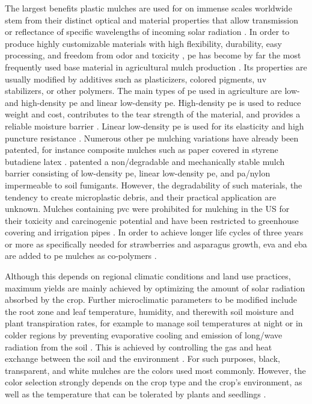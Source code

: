 The largest benefits plastic mulches are used for on immense scales worldwide stem from their distinct optical and material properties that allow transmission or reflectance of specific wavelengths of incoming solar radiation \citep{BrownBlack2001,Chalker-ScottImpact2007,CsizinszkyColor1995,GordonPlastic2008,HaynesUse1987}. In order to produce highly customizable materials with high flexibility, durability, easy processing, and freedom from odor and toxicity \citep{WrightIns2019}, \ac{pe} has become by far the most frequently used base material in agricultural mulch production \citep{Diaz-PerezBell2010,KaraEffects2013,LocascioRed2005,SivanNew2011}. Its properties are usually modified by additives such as plasticizers, colored pigments, \ac{uv} stabilizers, or other polymers. The main types of \ac{pe} used in agriculture are low- and high-density \ac{pe} and linear low-density \ac{pe}.
High-density \ac{pe} is used to reduce weight and cost, contributes to the tear strength of the material, and provides a reliable moisture barrier \citep{LamontPlastics2005}. Linear low-density \ac{pe} is used for its elasticity and high puncture resistance \citep{AnthonyMultilayer1983}. Numerous other \ac{pe} mulching variations have already been patented, for instance composite mulches such as paper covered in styrene butadiene latex \citep{DalebrouxMulching1997}.
\citet{SabbaghAgricultural2010} patented a non\-/degradable and mechanically stable mulch barrier consisting of low-density \ac{pe}, linear low-density \ac{pe}, and \ac{pa}\slash nylon impermeable to soil fumigants. However, the degradability of such materials, the tendency to create microplastic debris, and their practical application are unknown. Mulches containing \ac{pvc} were prohibited for mulching in the US for their toxicity and carcinogenic potential \citep{USEPAGuidelines2012} and have been restricted to greenhouse covering and irrigation pipes \citep{Scarascia-MugnozzaPlastic2011}. In order to achieve longer life cycles of three years or more \citep{BrucknerSpargelanbau2008} as specifically needed for strawberries and asparagus growth, \ac{eva} and \ac{eba} are added to \ac{pe} mulches as co-polymers \citep{EspiPlastic2006}.

Although this depends on regional climatic conditions and land use practices, maximum yields are mainly achieved by optimizing the amount of solar radiation absorbed by the crop. Further microclimatic parameters to be modified include the root zone and leaf temperature, humidity, and therewith soil moisture and plant transpiration rates, for example to manage soil temperatures at night or in colder regions by preventing evaporative cooling and emission of long\-/wave radiation from the soil \citep{HamOptical1993}. This is achieved by controlling the gas and heat exchange between the soil and the environment \citep{LamontPlastic1993,TararaMicroclimate2000}. For such purposes, black, transparent, and white mulches are the colors used most commonly. However, the color selection strongly depends on the crop type and the crop's environment, as well as the temperature that can be tolerated by plants and seedlings \citep{LamontPlastic1993,TararaMicroclimate2000}.

